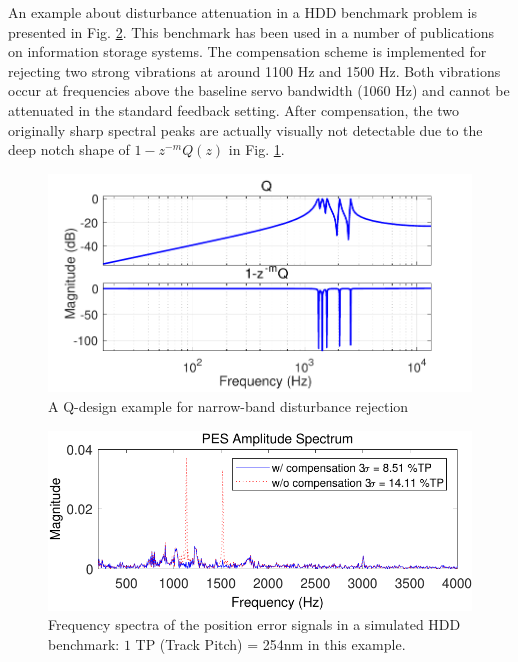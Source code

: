 \documentclass [11pt, proquest] {uwthesis}[2020/02/24]
\begin{document}
An example about disturbance attenuation in a HDD benchmark problem
\cite{sun2016enhanced} is presented in Fig. \ref{fig:Frequency-spectra-of-1}.
This benchmark has been used in a number of publications on information
storage systems. The compensation scheme is implemented for rejecting
two strong vibrations at around 1100 Hz and 1500 Hz. Both vibrations
occur at frequencies above the baseline servo bandwidth (1060 Hz)
and cannot be attenuated in the standard feedback setting. After compensation,
the two originally sharp spectral peaks are actually visually not
detectable due to the deep notch shape of $1-z^{-m}Q(z)$ in Fig.
\ref{fig:A-loop-shaping}.
\begin{figure}[!ht]
\begin{centering}
\includegraphics[width=13cm]{Loop-shaping/Q1minusQ}
\par\end{centering}
\caption{\label{fig:A-loop-shaping}A Q-design example for narrow-band disturbance
rejection}
\end{figure}
\begin{figure}[!ht]
\begin{centering}
\includegraphics[width=13cm]{Loop-shaping/freqDomain_specPES_compare_iter8_linear}
\par\end{centering}
\caption{\label{fig:Frequency-spectra-of-1}Frequency spectra of the position
error signals in a simulated HDD benchmark: $1$ TP (Track Pitch)
= 254nm in this example.}
\end{figure}
\end{document}
